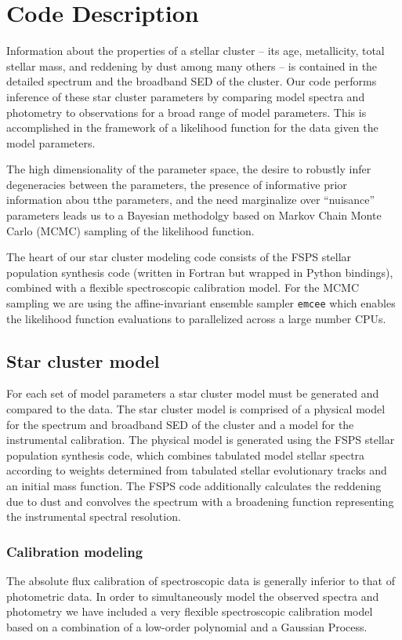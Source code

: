 \section{Code Description}

Information about the properties of a stellar cluster -- its age,
metallicity, total stellar mass, and reddening by dust among many
others -- is contained in the detailed spectrum and the broadband SED
of the cluster. Our code performs inference of these star cluster
parameters by comparing model spectra and photometry to observations
for a broad range of model parameters.  This is accomplished in the
framework of a likelihood function for the data given the model
parameters.

The high dimensionality of the parameter space, the desire to robustly
infer degeneracies between the parameters, the presence of informative
prior information abou tthe parameters, and the need marginalize over
``nuisance'' parameters leads us to a Bayesian methodolgy based on
Markov Chain Monte Carlo (MCMC) sampling of the likelihood function.

The heart of our star cluster modeling code consists of the FSPS
stellar population synthesis code \citep{fsps} (written in Fortran but
wrapped in Python bindings), combined with a flexible spectroscopic
calibration model.  For the MCMC sampling we are using the
affine-invariant ensemble sampler \texttt{emcee} \citep{emcee} which
enables the likelihood function evaluations to parallelized across a
large number CPUs.

\subsection{Star cluster model}
For each set of model parameters a star cluster model must be
generated and compared to the data. The star cluster model is
comprised of a physical model for the spectrum and broadband SED of
the cluster and a model for the instrumental calibration.  The
physical model is generated using the FSPS stellar population
synthesis code, which combines tabulated model stellar spectra
according to weights determined from tabulated stellar evolutionary
tracks and an initial mass function.  The FSPS code additionally
calculates the reddening due to dust and convolves the spectrum with a
broadening function representing the instrumental spectral resolution.

\subsubsection{Calibration modeling}
The absolute flux calibration of spectroscopic data is generally
inferior to that of photometric data.  In order to simultaneously model
the observed spectra and photometry we have included a very flexible
spectroscopic calibration model based on a combination of a low-order
polynomial and a Gaussian Process.

